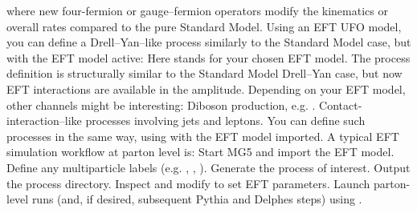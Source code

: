 {}where new four-fermion or gauge–fermion operators modify the kinematics or overall rates compared to the pure Standard Model.\markdownRendererParagraphSeparator
{}Using an EFT UFO model, you can define a Drell–Yan–like process similarly to the Standard Model case, but with the EFT model active:\markdownRendererInterblockSeparator
{}\markdownRendererInterblockSeparator
{}Here  stands for your chosen EFT model. The process definition is structurally similar to the Standard Model Drell–Yan case, but now EFT interactions are available in the amplitude.\markdownRendererInterblockSeparator
{}
\markdownRendererSectionEnd \markdownRendererSectionBegin
{}\markdownRendererInterblockSeparator
{}Depending on your EFT model, other channels might be interesting:\markdownRendererInterblockSeparator
{}\markdownRendererUlBeginTight
\markdownRendererUlItem Diboson production, e.g. .\markdownRendererUlItemEnd 
\markdownRendererUlItem Contact-interaction–like processes involving jets and leptons.\markdownRendererUlItemEnd 
\markdownRendererUlEndTight \markdownRendererInterblockSeparator
{}You can define such processes in the same way, using  with the EFT model imported.\markdownRendererInterblockSeparator
{}
\markdownRendererSectionEnd \markdownRendererSectionBegin
{}\markdownRendererInterblockSeparator
{}A typical EFT simulation workflow at parton level is:\markdownRendererInterblockSeparator
{}\markdownRendererOlBeginTight
{}Start MG5 and import the EFT model.\markdownRendererOlItemEnd 
{}Define any multiparticle labels (e.g. , , ).\markdownRendererOlItemEnd 
{}Generate the process of interest.\markdownRendererOlItemEnd 
{}Output the process directory.\markdownRendererOlItemEnd 
{}Inspect and modify  to set EFT parameters.\markdownRendererOlItemEnd 
{}Launch parton-level runs (and, if desired, subsequent Pythia and Delphes steps) using .\markdownRendererOlItemEnd 
